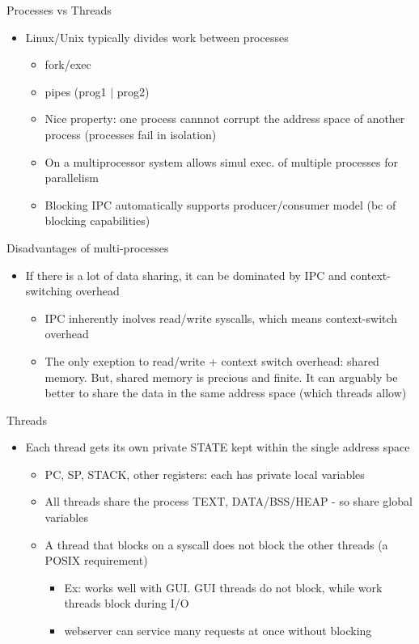 Processes vs Threads
\begin{itemize}
    \item Linux/Unix typically divides work between processes
    \begin{itemize}
        \item fork/exec
        \item pipes (prog1 $|$ prog2)
        \item Nice property: one process cannnot corrupt the address space of another process (processes fail in isolation)
        \item On a multiprocessor system allows simul exec. of multiple processes for parallelism
        \item Blocking IPC automatically supports producer/consumer model (bc of blocking capabilities)
    \end{itemize}
\end{itemize}
Disadvantages of multi-processes
\begin{itemize}
    \item If there is a lot of data sharing, it can be dominated by IPC and context-switching overhead
    \begin{itemize}
        \item IPC inherently inolves read/write syscalls, which means context-switch overhead
        \item The only exeption to read/write + context switch overhead: shared memory. But, shared memory is precious and finite. It can arguably be better to share the data in the same address space (which threads allow)
    \end{itemize}
\end{itemize}
Threads
\begin{itemize}
    \item Each thread gets its own private STATE kept within the single address space
    \begin{itemize}
        \item PC, SP, STACK, other registers: each has private local variables
        \item All threads share the process TEXT, DATA/BSS/HEAP - so share global variables
        \item A thread that blocks on a syscall does not block the other threads (a POSIX requirement)
        \begin{itemize}
            \item Ex: works well with GUI. GUI threads do not block, while work threads block during I/O
            \item webserver can service many requests at once without blocking
        \end{itemize}
    \end{itemize}
\end{itemize}
